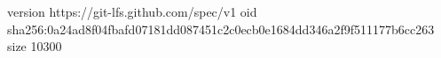 version https://git-lfs.github.com/spec/v1
oid sha256:0a24ad8f04fbafd07181dd087451c2c0ecb0e1684dd346a2f9f511177b6cc263
size 10300
